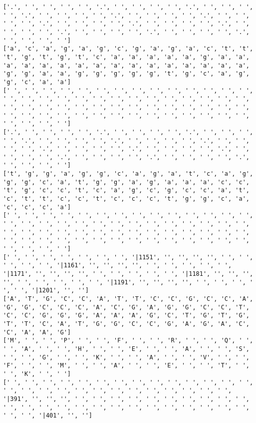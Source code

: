 \documentclass{article}
\begin{document}
\begin{Verbatim}
['.', ' ', ' ', ' ', ' ', '.', ' ', ' ', ' ', ' ', '.', ' ', ' ', ' ', ' ', '.', ' ', ' ', ' ', ' ', '.', ' ', ' ', ' ', ' ', '.', ' ', ' ', ' ', ' ', '.', ' ', ' ', ' ', ' ', '.', ' ', ' ', ' ', ' ', '.', ' ', ' ', ' ', ' ', '.', ' ', ' ', ' ', ' ', '.', ' ', ' ', ' ', ' ', '.', ' ', ' ', ' ', ' ']
['a', 'c', 'a', 'g', 'a', 'g', 'c', 'g', 'a', 'g', 'a', 'c', 't', 't', 't', 'g', 't', 'g', 't', 'c', 'a', 'a', 'a', 'a', 'a', 'g', 'a', 'a', 'a', 'a', 'a', 'a', 'a', 'a', 'a', 'a', 'a', 'a', 'a', 'a', 'a', 'a', 'g', 'g', 'a', 'a', 'g', 'g', 'g', 'g', 'g', 't', 'g', 'c', 'a', 'g', 'g', 'c', 'a', 'a']
[' ', ' ', ' ', ' ', ' ', ' ', ' ', ' ', ' ', ' ', ' ', ' ', ' ', ' ', ' ', ' ', ' ', ' ', ' ', ' ', ' ', ' ', ' ', ' ', ' ', ' ', ' ', ' ', ' ', ' ', ' ', ' ', ' ', ' ', ' ', ' ', ' ', ' ', ' ', ' ', ' ', ' ', ' ', ' ', ' ', ' ', ' ', ' ', ' ', ' ', ' ', ' ', ' ', ' ', ' ', ' ', ' ', ' ', ' ', ' ']
['.', ' ', ' ', ' ', ' ', '.', ' ', ' ', ' ', ' ', '.', ' ', ' ', ' ', ' ', '.', ' ', ' ', ' ', ' ', '.', ' ', ' ', ' ', ' ', '.', ' ', ' ', ' ', ' ', '.', ' ', ' ', ' ', ' ', '.', ' ', ' ', ' ', ' ', '.', ' ', ' ', ' ', ' ', '.', ' ', ' ', ' ', ' ', '.', ' ', ' ', ' ', ' ', '.', ' ', ' ', ' ', ' ']
['t', 'g', 'g', 'a', 'g', 'g', 'c', 'a', 'g', 'a', 't', 'c', 'a', 'g', 'g', 'g', 'c', 'a', 't', 'g', 'g', 'a', 'g', 'a', 'a', 'a', 'c', 'c', 't', 'g', 'c', 'c', 't', 'c', 'a', 'g', 'c', 'g', 'c', 'c', 'a', 't', 'c', 't', 't', 'c', 'c', 't', 'c', 'c', 'c', 't', 'g', 'g', 'c', 'a', 'c', 'c', 'c', 'a']
[' ', ' ', ' ', ' ', ' ', ' ', ' ', ' ', ' ', ' ', ' ', ' ', ' ', ' ', ' ', ' ', ' ', ' ', ' ', ' ', ' ', ' ', ' ', ' ', ' ', ' ', ' ', ' ', ' ', ' ', ' ', ' ', ' ', ' ', ' ', ' ', ' ', ' ', ' ', ' ', ' ', ' ', ' ', ' ', ' ', ' ', ' ', ' ', ' ', ' ', ' ', ' ', ' ', ' ', ' ', ' ', ' ', ' ', ' ', ' ']
[' ', ' ', ' ', ' ', ' ', ' ', ' ', '|1151', '', '', '', '', ' ', ' ', ' ', ' ', ' ', '|1161', '', '', '', '', ' ', ' ', ' ', ' ', ' ', '|1171', '', '', '', '', ' ', ' ', ' ', ' ', ' ', '|1181', '', '', '', '', ' ', ' ', ' ', ' ', ' ', '|1191', '', '', '', '', ' ', ' ', ' ', ' ', ' ', '|1201', '', '']
['A', 'T', 'G', 'C', 'C', 'A', 'T', 'T', 'C', 'C', 'G', 'C', 'C', 'A', 'G', 'G', 'C', 'C', 'C', 'A', 'C', 'G', 'A', 'G', 'G', 'C', 'C', 'T', 'C', 'C', 'G', 'G', 'G', 'A', 'A', 'A', 'G', 'C', 'T', 'G', 'T', 'G', 'T', 'T', 'C', 'A', 'T', 'G', 'G', 'C', 'C', 'G', 'A', 'G', 'A', 'C', 'C', 'A', 'A', 'G']
['M', ' ', ' ', 'P', ' ', ' ', 'F', ' ', ' ', 'R', ' ', ' ', 'Q', ' ', ' ', 'A', ' ', ' ', 'H', ' ', ' ', 'E', ' ', ' ', 'A', ' ', ' ', 'S', ' ', ' ', 'G', ' ', ' ', 'K', ' ', ' ', 'A', ' ', ' ', 'V', ' ', ' ', 'F', ' ', ' ', 'M', ' ', ' ', 'A', ' ', ' ', 'E', ' ', ' ', 'T', ' ', ' ', 'K', ' ', ' ']
[' ', ' ', ' ', ' ', ' ', ' ', ' ', ' ', ' ', ' ', ' ', ' ', ' ', ' ', ' ', ' ', ' ', ' ', ' ', ' ', ' ', ' ', ' ', ' ', ' ', ' ', ' ', '|391', '', '', '', ' ', ' ', ' ', ' ', ' ', ' ', ' ', ' ', ' ', ' ', ' ', ' ', ' ', ' ', ' ', ' ', ' ', ' ', ' ', ' ', ' ', ' ', ' ', ' ', ' ', ' ', '|401', '', '']
  

\end{Verbatim}
\end{document}
